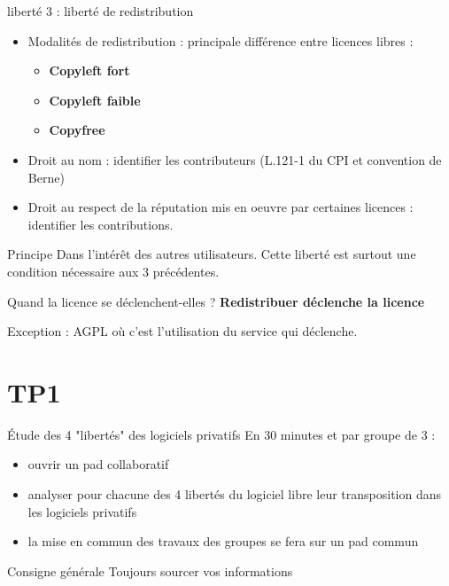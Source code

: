 \documentclass{beamer}
\begin{document}
\begin{frame}{liberté 3 : liberté de redistribution}
  \begin{itemize}
  \item Modalités de redistribution : principale différence entre licences libres :
    \begin{itemize}
    \item \textbf{Copyleft fort}
    \item \textbf{Copyleft faible}
    \item \textbf{Copyfree}
    \end{itemize}
  \item Droit au nom : identifier les contributeurs (L.121-1 du CPI et convention de Berne)
  \item Droit au respect de la réputation mis en oeuvre par certaines licences : identifier les contributions.
  \end{itemize}
\begin{alertblock}{Principe}
    Dans l'intérêt des autres utilisateurs. Cette liberté est surtout une condition nécessaire aux 3 précédentes.
  \end{alertblock}

\begin{alertblock}{Quand la licence se déclenchent-elles ?}
\textbf{Redistribuer déclenche la licence}
 \end{alertblock}
 
 Exception : AGPL où c'est l'utilisation du service qui déclenche.
\end{frame}

\section{TP1}

\begin{frame}{Étude des 4 "libertés" des logiciels privatifs}
  En 30 minutes et par groupe de 3 :
  \begin{itemize}
  \item ouvrir un pad collaboratif
  \item analyser pour chacune des 4 libertés du logiciel libre leur transposition dans les logiciels privatifs
  \item la mise en commun des travaux des groupes se fera sur un pad commun
  \end{itemize}

  \begin{alertblock}{Consigne générale}
    Toujours sourcer vos informations    
  \end{alertblock}
\end{frame}
\end{document}
